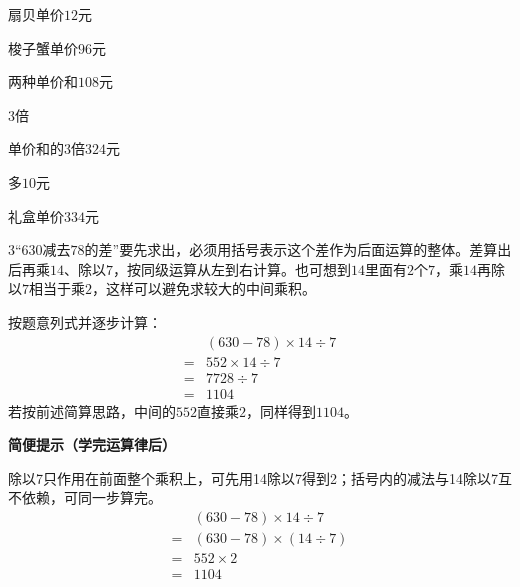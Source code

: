\documentclass[multi=snippet,border={5bp 20bp 5bp 5bp}]{standalone}
\newenvironment{snippet}[3]{\begin{minipage}{#1bp}\color{answerred}\fontsize{#2}{#3}\selectfont\raggedright}{\end{minipage}}
\begin{document}
\begin{snippet}{55.549999999999955}{7.5}{12.8}\SourceSans\setlength{\mathindent}{2bp}扇贝单价\(12\)元\end{snippet}
\begin{snippet}{55.549999999999955}{7.5}{12.8}\SourceSans\setlength{\mathindent}{2bp}梭子蟹单价\(96\)元\end{snippet}
\begin{snippet}{93.29999999999995}{8.5}{12.8}\SourceSans\setlength{\mathindent}{2bp}两种单价和\(108\)元\end{snippet}
\begin{snippet}{40.799999999999955}{8.5}{12.8}\SourceSans\setlength{\mathindent}{2bp}\(3\)倍\end{snippet}
\begin{snippet}{117.29999999999995}{8.5}{12.8}\SourceSans\setlength{\mathindent}{2bp}单价和的\(3\)倍\(324\)元\end{snippet}
\begin{snippet}{40.299999999999955}{8.5}{12.8}\SourceSans\setlength{\mathindent}{2bp}多\(10\)元\end{snippet}
\begin{snippet}{111.79999999999995}{8.5}{12.8}\SourceSans\setlength{\mathindent}{2bp}礼盒单价\(334\)元\end{snippet}
\begin{snippet}{505}{11.5}{14}\begin{multicols}{3}\raggedcolumns “\(630\)\allowbreak 减去\(78\)\allowbreak 的差”要先求出，必须用括号表示这个差作为后面运算的整体。差算出后再乘\(14\)\allowbreak 、除以\(7\)\allowbreak ，按同级运算从左到右计算。也可想到\(14\)\allowbreak 里面有\(2\)\allowbreak 个\(7\)\allowbreak ，乘\(14\)\allowbreak 再除以\(7\)\allowbreak 相当于乘\(2\)\allowbreak ，这样可以避免求较大的中间乘积。\par 按题意列式并逐步计算：\[\begin{aligned}&(630-78)\times14\div7\\={}&552\times14\div7\\={}&7728\div7\\={}&1104\end{aligned}\]若按前述简算思路，中间的\(552\)\allowbreak 直接乘\(2\)\allowbreak ，同样得到\(1104\)\allowbreak 。\par\textbf{简便提示（学完运算律后）}\par 除以7只作用在前面整个乘积上，可先用14除以7得到2；括号内的减法与14除以7互不依赖，可同一步算完。\[\begin{aligned}&(630-78)\times14\div7\\={}&(630-78)\times(14\div7)\\={}&552\times2\\={}&1104\end{aligned}\]\end{multicols}\end{snippet}
\end{document}
